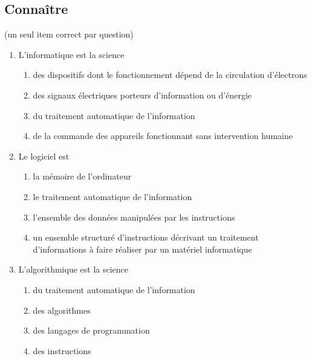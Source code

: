 \subsection{Connaître}
\begin{td}[QCM (1)]\label{td:qcmIntro}
(un seul item correct par question)
\em
\begin{enumerate}
\item L'informatique est la science
	\begin{enumerate}
	\item des dispositifs dont le fonctionnement dépend de 
		la circulation d'électrons
	\item des signaux électriques porteurs d'information ou d'énergie
	\item du traitement automatique de l'information
	\item de la commande des appareils fonctionnant sans intervention humaine
	\end{enumerate}
\item Le logiciel est
	\begin{enumerate}
	\item la mémoire de l'ordinateur
	\item le traitement automatique de l'information
	\item l'ensemble des données manipulées par les instructions
	\item un ensemble structuré d'instructions décrivant un traitement d'informations
		à faire réaliser par un matériel informatique
	\end{enumerate}
\item L'algorithmique est la science
	\begin{enumerate}
	\item du traitement automatique de l'information
	\item des algorithmes
	\item des langages de programmation
	\item des instructions
	\end{enumerate}

\end{enumerate}
\end{td}

